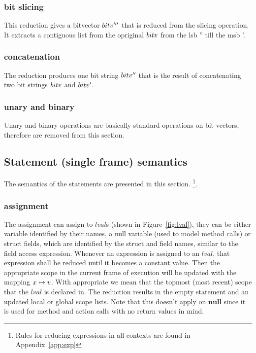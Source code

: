 \documentclass[UTF8]{article}
\begin{document}
\subsubsection*{bit slicing}
This reduction gives a bitvector $bitv'''$ that is reduced from the slicing operation. It extracts a contiguous list from the opriginal $bitv$ from the lsb \bitv'' till the msb \bitv'.

\begin{figure}[ht!]
    \ottusedrule{\ottdruleeXXsliceXXv{}}
\end{figure}




\subsubsection*{concatenation}
The reduction produces one bit string $bitv''$ that is the result of concatenating two bit strings $bitv$ and $bitv'$.

\begin{figure}[ht!]
    \ottusedrule{\ottdruleeXXconcatXXv{}}
\end{figure}




\subsubsection*{unary and binary}
Unary and binary operations are basically standard operations on bit vectors, therefore are removed from this section.  



\subsection{Statement (single frame) semantics}
The semantics of the statements are presented in this section. \footnote{Rules for reducing expressions in all contexts are found in Appendix~\ref{app:exp}}.


\subsubsection*{assignment}
The assignment can assign to $lval$s (shown in Figure~\ref{fig:lval}), they can be either variable identified by their names, a null variable (used to model method calls) or struct fields, which are identified by the struct and field names, similar to the field access expression. Whenever an expression is assigned to an $lval$, that expression shall be reduced until it becomes a constant value. Then the appropriate scope in the current frame of execution will be updated with the mapping  $x \mapsto v$. With appropriate we mean that the topmost (most recent) scope that the $lval$ is declared in. The reduction results in the empty statement and an updated local or global scope lists. Note that this doesn't apply on $\mathbf{null}$ since it is used for method and action calls with no return values in mind.
\end{document}
